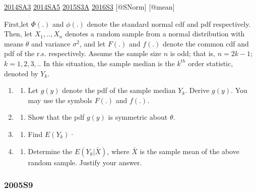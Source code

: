 \documentclass[10pt,twocolumn,portrait]{article}
\providecommand{\tightlist}{%
  \setlength{\itemsep}{0pt}\setlength{\parskip}{0pt}}
\begin{document}
\protect\hyperlink{sa3-2}{2014SA3} \protect\hyperlink{sa5-1}{2014SA5}
\protect\hyperlink{s3a-1}{2015S3A} \protect\hyperlink{s3-4}{2016S3}
{[}@SNorm{]} {[}@mean{]}

First,let \(\Phi(.)\) and \(\phi(.)\) denote the standard normal cdf and
pdf respectively. Then, let \(X_1,..,X_n\) denotes a random sample from
a normal distribution with means \(\theta\) and variance \(\sigma^2\),
and let \(F(.)\) and \(f(.)\) denote the common cdf and pdf of the r.s.
respectively. Assume the sample size \(n\) is odd; that is, \(n=2k-1\);
\(k=1,2,3,..\) In this situation, the sample median is the \(k^{th}\)
order statistic, denoted by \(Y_k\).

\begin{enumerate}
\def\labelenumi{(\alph{enumi})}
\item
  \begin{enumerate}
  \def\labelenumii{(\arabic{enumii})}
  \setcounter{enumii}{4}
  \tightlist
  \item
    Let \(g(y)\) denote the pdf of the sample median \(Y_k\). Derive
    \(g(y)\). You may use the symbols \(F(.)\) and \(f(.)\).
  \end{enumerate}
\item
  \begin{enumerate}
  \def\labelenumii{(\arabic{enumii})}
  \setcounter{enumii}{2}
  \tightlist
  \item
    Show that the pdf \(g(y)\) is symmetric about \(\theta\).
  \end{enumerate}
\item
  \begin{enumerate}
  \def\labelenumii{(\arabic{enumii})}
  \setcounter{enumii}{1}
  \tightlist
  \item
    Find \(E(Y_k)\)·
  \end{enumerate}
\item
  \begin{enumerate}
  \def\labelenumii{(\arabic{enumii})}
  \setcounter{enumii}{4}
  \tightlist
  \item
    Determine the \(E(Y_k|\bar X)\), where \(\bar X\) is the sample mean
    of the above random sample. Justify your answer.
  \end{enumerate}
\end{enumerate}

\hypertarget{s9-1}{%
\subsubsection{2005S9}\label{s9-1}}
\end{document}
